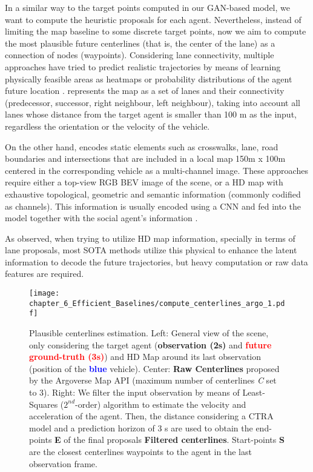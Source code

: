 In a similar way to the target points computed in our \ac{GAN}-based model, we want to compute the heuristic proposals for each agent. Nevertheless, instead of limiting the map baseline to some discrete target points, now we aim to compute the most plausible future centerlines (that is, the center of the lane) as a connection of nodes (waypoints). Considering lane connectivity, multiple approaches have tried to predict realistic trajectories by means of learning physically feasible areas as heatmaps or probability distributions of the agent future location \cite{dendorfer2020goal, sadeghian2019sophie, gilles2021home}. \cite{liang2020learning} represents the map as a set of lanes and their connectivity (predecessor, successor, right neighbour, left neighbour), taking into account all lanes whose distance from the target agent is smaller than 100 m as the input, regardless the orientation or the velocity of the vehicle. 

On the other hand, \cite{djuric2021multixnet} encodes static elements such as crosswalks, lane, road boundaries and intersections that are included in a local map 150m x 100m centered in the corresponding vehicle  as a multi-channel image.  These approaches require either a top-view RGB \ac{BEV} image of the scene, or a HD map with exhaustive topological, geometric and semantic information (commonly codified as channels). This information is usually encoded using a \ac{CNN} and fed into the model together with the social agent's information \cite{dendorfer2020goal, sadeghian2019sophie, gao2020vectornet}. 

As observed, when trying to utilize HD map information, specially in terms of lane proposals, most \ac{SOTA} methods utilize this physical to enhance the latent information to decode the future trajectories, but heavy computation or raw data features are required. 

\begin{figure*}[]
	\centering
	\texttt{[image: chapter\_6\_Efficient\_Baselines/compute\_centerlines\_argo\_1.pdf]}
	\captionsetup{justification=justified}
	\caption[Plausible centerlines estimation in Argoverse 1]{Plausible centerlines estimation. Left: General view of the scene, only considering the target agent (\textbf{\textcolor{YellowOrange}{observation (2s)}} and \textbf{\textcolor{red}{future ground-truth (3s)}}) and HD Map around its last observation (position of the \textbf{\textcolor{blue}{blue}} vehicle). Center: \textbf{Raw Centerlines} proposed by the Argoverse Map API (maximum number of centerlines \textit{C} set to 3). Right: We filter the input observation by means of Least-Squares ($2^{nd}$-order) algorithm to estimate the velocity and acceleration of the agent. Then, the distance considering a \ac{CTRA} model and a prediction horizon of 3 s are used to obtain the end-points \textbf{E} of the final proposals \textbf{Filtered centerlines}. Start-points \textbf{S} are the closest centerlines waypoints to the agent in the last observation frame.}
	\label{fig:chapter_6_Efficient_Baselines/efficient_baselines_hdmap_filtering}
\end{figure*}

